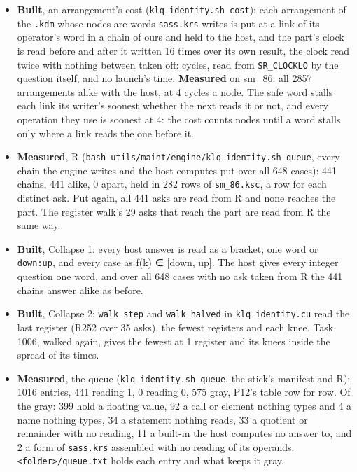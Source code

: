 \begin{itemize}
\item \textbf{Built}, an arrangement's cost (\texttt{klq\_\allowbreak{}identity.\allowbreak{}sh cost}): each arrangement of the \texttt{.\allowbreak{}kdm} whose nodes are words \texttt{sass.\allowbreak{}krs} writes is put at a link of its operator's word in a chain of ours and held to the host, and the part's clock is read before and after it written 16 times over its own result, the clock read twice with nothing between taken off: cycles, read from \texttt{SR\_\allowbreak{}CLOCKLO} by the question itself, and no launch's time. \textbf{Measured} on sm\_\allowbreak{}86: all 2857 arrangements alike with the host, at 4 cycles a node. The safe word stalls each link its writer's soonest whether the next reads it or not, and every operation they use is soonest at 4: the cost counts nodes until a word stalls only where a link reads the one before it.
\item \textbf{Measured}, R (\texttt{bash utils/\allowbreak{}maint/\allowbreak{}engine/\allowbreak{}klq\_\allowbreak{}identity.\allowbreak{}sh queue}, every chain the engine writes and the host computes put over all 648 cases): 441 chains, 441 alike, 0 apart, held in 282 rows of \texttt{sm\_\allowbreak{}86.\allowbreak{}ksc}, a row for each distinct ask. Put again, all 441 asks are read from R and none reaches the part. The register walk's 29 asks that reach the part are read from R the same way.
\item \textbf{Built}, Collapse 1: every host answer is read as a bracket, one word or \texttt{down:up}, and every case as f(k) ∈ [down, up]. The host gives every integer question one word, and over all 648 cases with no ask taken from R the 441 chains answer alike as before.
\item \textbf{Built}, Collapse 2: \texttt{walk\_\allowbreak{}step} and \texttt{walk\_\allowbreak{}halved} in \texttt{klq\_\allowbreak{}identity.\allowbreak{}cu} read the last register (R252 over 35 asks), the fewest registers and each knee. Task 1006, walked again, gives the fewest at 1 register and its knees inside the spread of its times.
\item \textbf{Measured}, the queue (\texttt{klq\_\allowbreak{}identity.\allowbreak{}sh queue}, the stick's manifest and R): 1016 entries, 441 reading 1, 0 reading 0, 575 gray, P12's table row for row. Of the gray: 399 hold a floating value, 92 a call or element nothing types and 4 a name nothing types, 34 a statement nothing reads, 33 a quotient or remainder with no reading, 11 a built-in the host computes no answer to, and 2 a form of \texttt{sass.\allowbreak{}krs} assembled with no reading of its operands. \texttt{<folder>/\allowbreak{}queue.\allowbreak{}txt} holds each entry and what keeps it gray.

\end{itemize}
